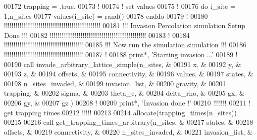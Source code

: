 \begin{DoxyCode}
00172 trapping = .true.
00173 \textcolor{comment}{!}
00174 \textcolor{comment}{! set values}
00175 \textcolor{comment}{!}
00176 \textcolor{keyword}{do} i\_site = 1,n\_sites
00177    values(i\_site) = rand()
00178 \textcolor{keyword}{enddo}
00179 \textcolor{comment}{!}
00180 \textcolor{comment}{!!!!!!!!!!!!!!!!!!!!!!!!!!!!!!!!!!!!!!!!!!!!!!!!!!}
00181 \textcolor{comment}{!!! Invasion Percolation simulation Setup Done !!!}
00182 \textcolor{comment}{!!!!!!!!!!!!!!!!!!!!!!!!!!!!!!!!!!!!!!!!!!!!!!!!!!}
00183 \textcolor{comment}{!}
00184 \textcolor{comment}{!!!!!!!!!!!!!!!!!!!!!!!!!!!!!!!!!!!!!!!!!}
00185 \textcolor{comment}{!!! Now run the simulation simulation !!!}
00186 \textcolor{comment}{!!!!!!!!!!!!!!!!!!!!!!!!!!!!!!!!!!!!!!!!!}
00187 \textcolor{comment}{!}
00188 print*, \textcolor{stringliteral}{'Starting invasion ...'}
00189 \textcolor{comment}{!}
00190 call invade\_arbitrary\_lattice\_simple(n\_sites,         &
00191                                    x,               &
00192                                    y,               &
00193                                    z,               &
00194                                    offsets,         &
00195                                    connectivity,    &
00196                                    values,          &
00197                                    states,          &
00198                                    n\_sites\_invaded, &
00199                                    invasion\_list,   &
00200                                    gravity,         &
00201                                    trapping,        &
00202                                    sigma,           &
00203                                    theta\_c,         &
00204                                    delta\_rho,       &
00205                                    gx,              &
00206                                    gy,              &
00207                                    gz               )
00208 \textcolor{comment}{!}
00209 print*, \textcolor{stringliteral}{'Invasion done !'}
00210 \textcolor{comment}{!!!!!!!}
00211 \textcolor{comment}{! get trapping times}
00212 \textcolor{comment}{!!!!!}
00213 
00214 \textcolor{keyword}{allocate}(trapping\_times(n\_sites))
00215 
00216  call get\_trapping\_times\_arbitrary(n\_sites,           &
00217                                           states,            &
00218                                           offsets,           &
00219                                           connectivity,      &
00220                                           n\_sites\_invaded,   &
00221                                           invasion\_list,     &

\end{DoxyCode}
